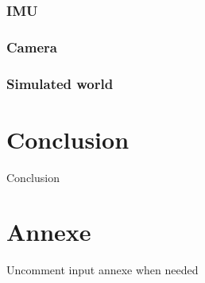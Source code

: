 \documentclass[11pt]{article}
\begin{document}
            \subsubsection{IMU}
            \subsubsection{Camera}
        \subsubsection{Simulated world}


    \section{Conclusion}

        Conclusion     

    \newpage

    \newpage
    \printnoidxglossaries %

    \newpage
    \listoffigures


    \newpage
    \section*{Annexe}
    Uncomment input annexe when needed



    
\end{document}

